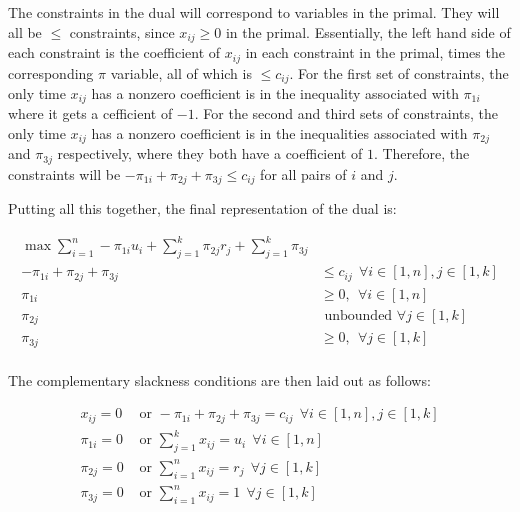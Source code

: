 \documentclass[fleqn]{homework}
\begin{document}
\begin{problem}{4}
    The constraints in the dual will correspond to variables in the primal.
    They will all be $\le$ constraints, since $x_{ij} \ge 0$ in the primal.
    Essentially, the left hand side of each constraint is the coefficient of
    $x_{ij}$ in each constraint in the primal, times the corresponding $\pi$
    variable, all of which is $\le c_{ij}$.  For the first set of constraints,
    the only time $x_{ij}$ has a nonzero coefficient is in the inequality
    associated with $\pi_{1i}$ where it gets a cefficient of $-1$.  For the
    second and third sets of constraints, the only time $x_{ij}$ has a nonzero
    coefficient is in the inequalities associated with $\pi_{2j}$ and $\pi_{3j}$
    respectively, where they both have a coefficient of $1$.  Therefore, the
    constraints will be $-\pi_{1i} + \pi_{2j} + \pi_{3j} \le c_{ij}$ for all
    pairs of $i$ and $j$.

    Putting all this together, the final representation of the dual is:

    \begin{align*}
      \max \sum_{i=1}^n -\pi_{1i} u_i + \sum_{j=1}^k \pi_{2j} r_j + \sum_{j=1}^k
    \pi_{3j} &\\
      -\pi_{1i} + \pi_{2j} + \pi_{3j} &\le c_{ij} \:\: \forall i \in [1, n], j \in [1, k] \\
      \pi_{1i} &\ge 0, \:\: \forall i \in [1, n] \\
      \pi_{2j} &\text{ unbounded } \forall j \in [1, k] \\
      \pi_{3j} &\ge 0, \:\: \forall j \in [1, k] \\
    \end{align*}

    The complementary slackness conditions are then laid out as follows:

    \begin{align*}
      x_{ij} = 0 &\text{ or } -\pi_{1i} + \pi_{2j} + \pi_{3j} = c_{ij} \:\: \forall i \in [1,n], j \in [1, k] \\
      \pi_{1i} = 0 &\text{ or } \sum_{j=1}^k x_{ij} = u_{i} \:\: \forall i \in [1,n] \\
      \pi_{2j} = 0 &\text{ or } \sum_{i=1}^n x_{ij} = r_j \:\: \forall j \in [1,k] \\
      \pi_{3j} = 0 &\text{ or } \sum_{i=1}^n x_{ij} = 1 \:\: \forall j \in [1,k]
    \end{align*}
  \end{problem}
\end{document}
